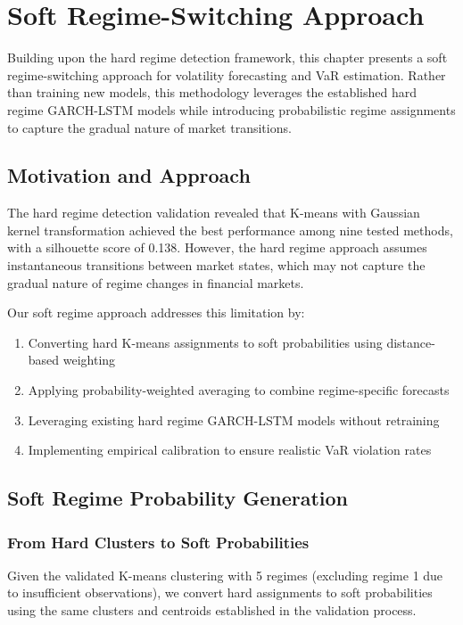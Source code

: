 \chapter{Soft Regime-Switching Approach}

Building upon the hard regime detection framework, this chapter presents a soft regime-switching approach for volatility forecasting and VaR estimation. Rather than training new models, this methodology leverages the established hard regime GARCH-LSTM models while introducing probabilistic regime assignments to capture the gradual nature of market transitions.

\section{Motivation and Approach}

The hard regime detection validation revealed that K-means with Gaussian kernel transformation achieved the best performance among nine tested methods, with a silhouette score of 0.138. However, the hard regime approach assumes instantaneous transitions between market states, which may not capture the gradual nature of regime changes in financial markets.

Our soft regime approach addresses this limitation by:
\begin{enumerate}
    \item Converting hard K-means assignments to soft probabilities using distance-based weighting
    \item Applying probability-weighted averaging to combine regime-specific forecasts
    \item Leveraging existing hard regime GARCH-LSTM models without retraining
    \item Implementing empirical calibration to ensure realistic VaR violation rates
\end{enumerate}

\section{Soft Regime Probability Generation}

\subsection{From Hard Clusters to Soft Probabilities}

Given the validated K-means clustering with 5 regimes (excluding regime 1 due to insufficient observations), we convert hard assignments to soft probabilities using the same clusters and centroids established in the validation process.

